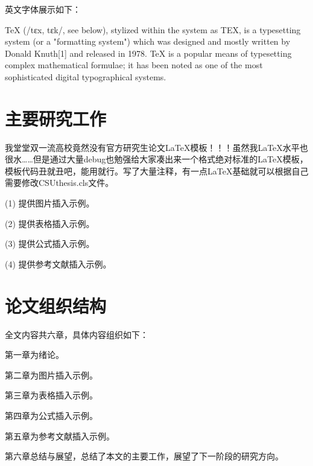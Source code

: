 英文字体展示如下：

TeX (/tɛx, tɛk/, see below), stylized within the system as TEX, is a typesetting system (or a "formatting system") which was designed and mostly written by Donald Knuth[1] and released in 1978. TeX is a popular means of typesetting complex mathematical formulae; it has been noted as one of the most sophisticated digital typographical systems.


\section{主要研究工作}
我堂堂双一流高校竟然没有官方研究生论文LaTeX模板！！！虽然我LaTeX水平也很水……但是通过大量debug也勉强给大家凑出来一个格式绝对标准的LaTeX模板，模板代码丑就丑吧，能用就行。写了大量注释，有一点LaTeX基础就可以根据自己需要修改CSUthesis.cls文件。

(1) 提供图片插入示例。

(2) 提供表格插入示例。

(3) 提供公式插入示例。

(4) 提供参考文献插入示例。

\section{论文组织结构}

全文内容共六章，具体内容组织如下：

第一章为绪论。

第二章为图片插入示例。

第三章为表格插入示例。

第四章为公式插入示例。

第五章为参考文献插入示例。

第六章总结与展望，总结了本文的主要工作，展望了下一阶段的研究方向。
